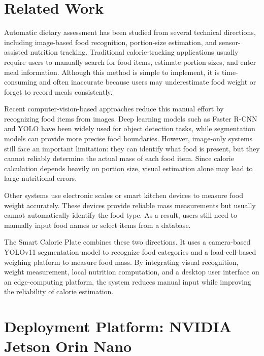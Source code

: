\documentclass[11pt,a4paper]{article}
\begin{document}
\section{Related Work}

Automatic dietary assessment has been studied from several technical directions, including image-based food recognition, portion-size estimation, and sensor-assisted nutrition tracking. Traditional calorie-tracking applications usually require users to manually search for food items, estimate portion sizes, and enter meal information. Although this method is simple to implement, it is time-consuming and often inaccurate because users may underestimate food weight or forget to record meals consistently.

Recent computer-vision-based approaches reduce this manual effort by recognizing food items from images. Deep learning models such as Faster R-CNN and YOLO have been widely used for object detection tasks, while segmentation models can provide more precise food boundaries. However, image-only systems still face an important limitation: they can identify what food is present, but they cannot reliably determine the actual mass of each food item. Since calorie calculation depends heavily on portion size, visual estimation alone may lead to large nutritional errors.

Other systems use electronic scales or smart kitchen devices to measure food weight accurately. These devices provide reliable mass measurements but usually cannot automatically identify the food type. As a result, users still need to manually input food names or select items from a database.

The Smart Calorie Plate combines these two directions. It uses a camera-based YOLOv11 segmentation model to recognize food categories and a load-cell-based weighing platform to measure food mass. By integrating visual recognition, weight measurement, local nutrition computation, and a desktop user interface on an edge-computing platform, the system reduces manual input while improving the reliability of calorie estimation.

\section{Deployment Platform: NVIDIA Jetson Orin Nano}
\end{document}
